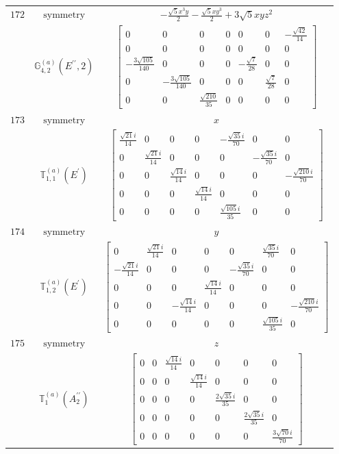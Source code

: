 \documentclass[fleqn,8pt,landscape]{jsarticle}
\begin{document}
\begin{longtable}{ccc}
$ 172 $ & $ \text{symmetry} $ & $ - \frac{\sqrt{5} x^{3} y}{2} - \frac{\sqrt{5} x y^{3}}{2} + 3 \sqrt{5} x y z^{2} $ \\
$  $ & $ \mathbb{G}_{4,2}^{(a)}(E^{\prime\prime},2) $ & $ \begin{bmatrix} 0 & 0 & 0 & 0 & 0 & 0 & - \frac{\sqrt{42}}{14} \\ 0 & 0 & 0 & 0 & 0 & 0 & 0 \\ - \frac{3 \sqrt{105}}{140} & 0 & 0 & 0 & - \frac{\sqrt{7}}{28} & 0 & 0 \\ 0 & - \frac{3 \sqrt{105}}{140} & 0 & 0 & 0 & \frac{\sqrt{7}}{28} & 0 \\ 0 & 0 & \frac{\sqrt{210}}{35} & 0 & 0 & 0 & 0 \end{bmatrix} $ \\ \hline
$ 173 $ & $ \text{symmetry} $ & $ x $ \\
$  $ & $ \mathbb{T}_{1,1}^{(a)}(E^{\prime}) $ & $ \begin{bmatrix} \frac{\sqrt{21} i}{14} & 0 & 0 & 0 & - \frac{\sqrt{35} i}{70} & 0 & 0 \\ 0 & \frac{\sqrt{21} i}{14} & 0 & 0 & 0 & - \frac{\sqrt{35} i}{70} & 0 \\ 0 & 0 & \frac{\sqrt{14} i}{14} & 0 & 0 & 0 & - \frac{\sqrt{210} i}{70} \\ 0 & 0 & 0 & \frac{\sqrt{14} i}{14} & 0 & 0 & 0 \\ 0 & 0 & 0 & 0 & \frac{\sqrt{105} i}{35} & 0 & 0 \end{bmatrix} $ \\ \hline
$ 174 $ & $ \text{symmetry} $ & $ y $ \\
$  $ & $ \mathbb{T}_{1,2}^{(a)}(E^{\prime}) $ & $ \begin{bmatrix} 0 & \frac{\sqrt{21} i}{14} & 0 & 0 & 0 & \frac{\sqrt{35} i}{70} & 0 \\ - \frac{\sqrt{21} i}{14} & 0 & 0 & 0 & - \frac{\sqrt{35} i}{70} & 0 & 0 \\ 0 & 0 & 0 & \frac{\sqrt{14} i}{14} & 0 & 0 & 0 \\ 0 & 0 & - \frac{\sqrt{14} i}{14} & 0 & 0 & 0 & - \frac{\sqrt{210} i}{70} \\ 0 & 0 & 0 & 0 & 0 & \frac{\sqrt{105} i}{35} & 0 \end{bmatrix} $ \\ \hline
$ 175 $ & $ \text{symmetry} $ & $ z $ \\
$  $ & $ \mathbb{T}_{1}^{(a)}(A_{2}^{\prime\prime}) $ & $ \begin{bmatrix} 0 & 0 & \frac{\sqrt{14} i}{14} & 0 & 0 & 0 & 0 \\ 0 & 0 & 0 & \frac{\sqrt{14} i}{14} & 0 & 0 & 0 \\ 0 & 0 & 0 & 0 & \frac{2 \sqrt{35} i}{35} & 0 & 0 \\ 0 & 0 & 0 & 0 & 0 & \frac{2 \sqrt{35} i}{35} & 0 \\ 0 & 0 & 0 & 0 & 0 & 0 & \frac{3 \sqrt{70} i}{70} \end{bmatrix} $ \\ \hline

\end{longtable}
\end{document}
